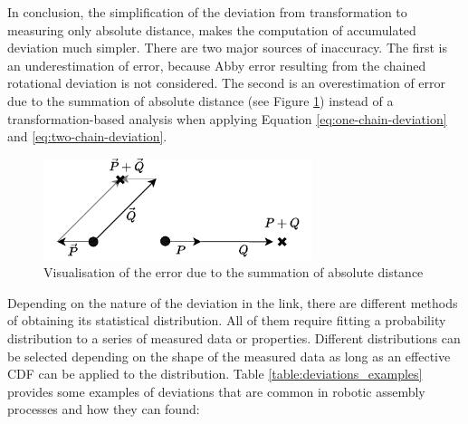 In conclusion, the simplification of the deviation from transformation to measuring only absolute distance, makes the computation of accumulated deviation much simpler. There are two major sources of inaccuracy. The first is an underestimation of error, because Abby error resulting from the chained rotational deviation is not considered. The second is an overestimation of error due to the summation of absolute distance (see Figure \ref{fig:summation_error}) instead of a transformation-based analysis when applying Equation \ref{eq:one-chain-deviation} and \ref{eq:two-chain-deviation}.

\begin{figure}
    \centering
    \includegraphics[width=0.70\textwidth]{images/09/P + Q Error.pdf}
    \caption{Visualisation of the error due to the summation of absolute distance }
    \label{fig:summation_error}
\end{figure}

Depending on the nature of the deviation in the link, there are different methods of obtaining its statistical distribution. All of them require fitting a probability distribution to a series of measured data or properties. Different distributions can be selected depending on the shape of the measured data as long as an effective CDF can be applied to the distribution. Table \ref{table:deviations_examples} provides some examples of deviations that are
common in robotic assembly processes and how they can found:

